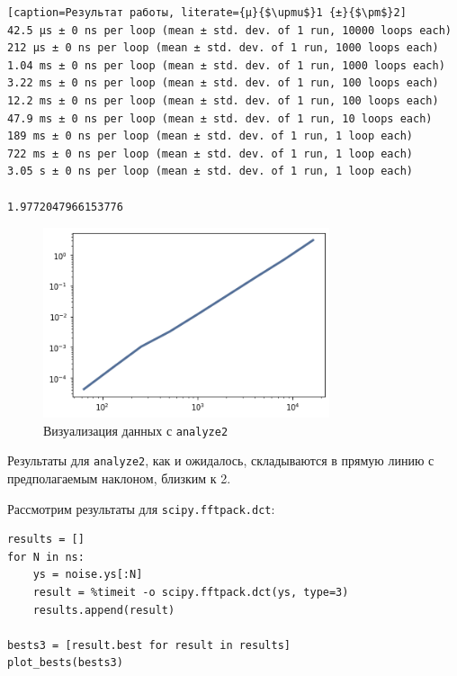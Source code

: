 \documentclass[a4paper,12pt]{report}
\begin{document}
\begin{lstlisting}[caption=Результат работы, literate={µ}{$\upmu$}1 {±}{$\pm$}2]
42.5 µs ± 0 ns per loop (mean ± std. dev. of 1 run, 10000 loops each)
212 µs ± 0 ns per loop (mean ± std. dev. of 1 run, 1000 loops each)
1.04 ms ± 0 ns per loop (mean ± std. dev. of 1 run, 1000 loops each)
3.22 ms ± 0 ns per loop (mean ± std. dev. of 1 run, 100 loops each)
12.2 ms ± 0 ns per loop (mean ± std. dev. of 1 run, 100 loops each)
47.9 ms ± 0 ns per loop (mean ± std. dev. of 1 run, 10 loops each)
189 ms ± 0 ns per loop (mean ± std. dev. of 1 run, 1 loop each)
722 ms ± 0 ns per loop (mean ± std. dev. of 1 run, 1 loop each)
3.05 s ± 0 ns per loop (mean ± std. dev. of 1 run, 1 loop each)

1.9772047966153776
\end{lstlisting}

\begin{figure}[H]
        \centering
        \includegraphics[width=0.75\textwidth]{lab6_fig1_2.png}
        \caption{Визуализация данных с \texttt{analyze2}}
        \label{fig:lab6_fig1_2}
\end{figure}

Результаты для \texttt{analyze2}, как и ожидалось, складываются в прямую линию с предполагаемым наклоном, близким к 2.

Рассмотрим результаты для \texttt{scipy.fftpack.dct}:

\begin{lstlisting}[caption=Работа с \texttt{scipy.fftpack.dct}]
results = []
for N in ns:
    ys = noise.ys[:N]
    result = %timeit -o scipy.fftpack.dct(ys, type=3)
    results.append(result)

bests3 = [result.best for result in results]
plot_bests(bests3)
\end{lstlisting}
\end{document}
